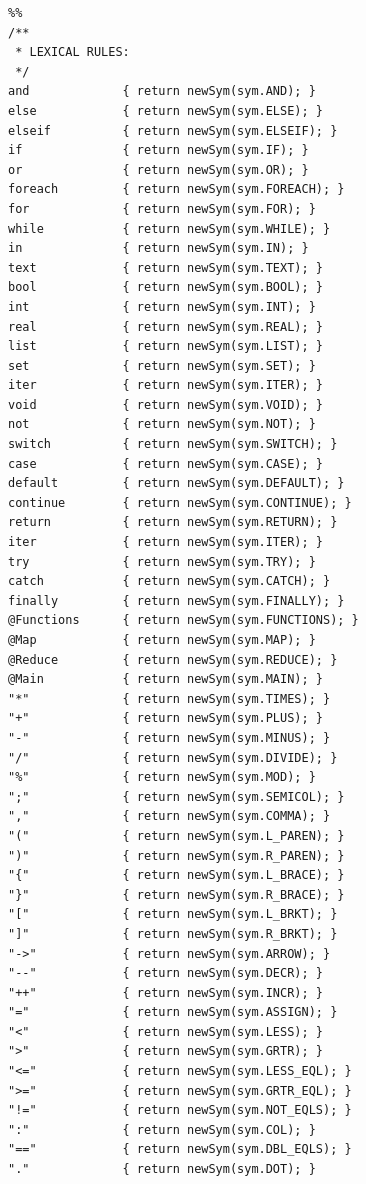 \documentclass{report}
\begin{document}
\begin{verbatim}
%%
/**
 * LEXICAL RULES:
 */
and             { return newSym(sym.AND); }
else            { return newSym(sym.ELSE); }
elseif          { return newSym(sym.ELSEIF); }
if              { return newSym(sym.IF); }
or              { return newSym(sym.OR); }
foreach         { return newSym(sym.FOREACH); }
for             { return newSym(sym.FOR); }
while           { return newSym(sym.WHILE); }
in              { return newSym(sym.IN); }
text            { return newSym(sym.TEXT); }
bool            { return newSym(sym.BOOL); }
int             { return newSym(sym.INT); }
real            { return newSym(sym.REAL); }
list            { return newSym(sym.LIST); }
set             { return newSym(sym.SET); }
iter            { return newSym(sym.ITER); }
void            { return newSym(sym.VOID); }
not             { return newSym(sym.NOT); }
switch          { return newSym(sym.SWITCH); }
case            { return newSym(sym.CASE); }
default         { return newSym(sym.DEFAULT); }
continue        { return newSym(sym.CONTINUE); }
return          { return newSym(sym.RETURN); }
iter            { return newSym(sym.ITER); }
try             { return newSym(sym.TRY); }
catch           { return newSym(sym.CATCH); }
finally         { return newSym(sym.FINALLY); }
@Functions      { return newSym(sym.FUNCTIONS); }
@Map            { return newSym(sym.MAP); }
@Reduce         { return newSym(sym.REDUCE); }
@Main           { return newSym(sym.MAIN); }
"*"             { return newSym(sym.TIMES); }
"+"             { return newSym(sym.PLUS); }
"-"             { return newSym(sym.MINUS); }
"/"             { return newSym(sym.DIVIDE); }
"%"             { return newSym(sym.MOD); }
";"             { return newSym(sym.SEMICOL); }
","             { return newSym(sym.COMMA); }
"("             { return newSym(sym.L_PAREN); }
")"             { return newSym(sym.R_PAREN); }
"{"             { return newSym(sym.L_BRACE); }
"}"             { return newSym(sym.R_BRACE); }
"["             { return newSym(sym.L_BRKT); }
"]"             { return newSym(sym.R_BRKT); }
"->"            { return newSym(sym.ARROW); }
"--"            { return newSym(sym.DECR); }
"++"            { return newSym(sym.INCR); }
"="             { return newSym(sym.ASSIGN); }
"<"             { return newSym(sym.LESS); }
">"             { return newSym(sym.GRTR); }
"<="            { return newSym(sym.LESS_EQL); }
">="            { return newSym(sym.GRTR_EQL); }
"!="            { return newSym(sym.NOT_EQLS); }
":"             { return newSym(sym.COL); }
"=="            { return newSym(sym.DBL_EQLS); }
"."             { return newSym(sym.DOT); }

\end{verbatim}
\end{document}
